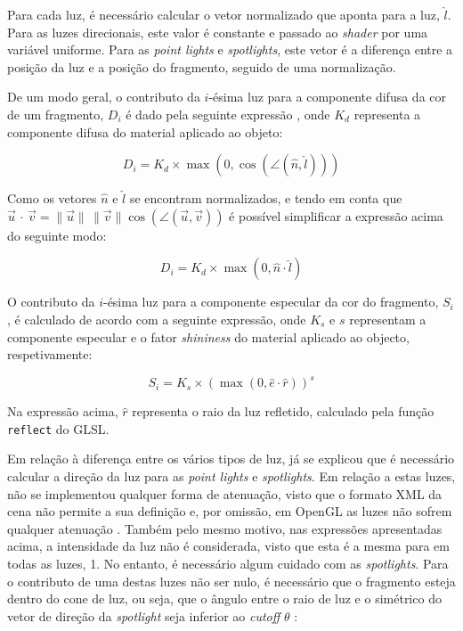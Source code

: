 \documentclass[12pt, a4paper]{article}
\begin{document}
Para cada luz, é necessário calcular o vetor normalizado que aponta para a luz, $\hat{l}$. Para as
luzes direcionais, este valor é constante e passado ao \emph{shader} por uma variável uniforme. Para
as \emph{point lights} e \emph{spotlights}, este vetor é a diferença entre a posição da luz e a
posição do fragmento, seguido de uma normalização.

De um modo geral, o contributo da $i$-ésima luz para a componente difusa da cor de um fragmento,
$D_i$ é dado pela seguinte expressão \cite{learn-opengl-1}, onde $K_d$ representa a componente
difusa do material aplicado ao objeto:

$$
D_i = K_d \times \max \left ( 0, \cos \left ( \angle (\hat{n}, \hat{l}) \right ) \right )
$$

Como os vetores $\hat{n}$ e $\hat{l}$ se encontram normalizados, e tendo em conta que
$
\vec{u} \, \cdot \, \vec{v} =
\lVert \vec{u} \rVert \, \lVert \vec{v} \rVert \cos (\angle (\vec{u}, \vec{v}))
$
é possível simplificar a expressão acima do seguinte modo:

$$
D_i = K_d \times \max \left ( 0, \hat{n} \cdot \hat{l} \right )
$$

O contributo da $i$-ésima luz para a componente especular da cor do fragmento, $S_i$, é calculado
de acordo com a seguinte expressão, onde $K_s$ e $s$ representam a componente especular e o fator
\emph{shininess} do material aplicado ao objecto, respetivamente:

$$
S_i = K_s \times \left ( \max \left (0, \hat{e} \cdot \hat{r} \right ) \right ) ^ s
$$

Na expressão acima, $\hat{r}$ representa o raio da luz refletido, calculado pela função
\texttt{reflect} do GLSL.

Em relação à diferença entre os vários tipos de luz, já se explicou que é necessário calcular a
direção da luz para as \emph{point lights} e \emph{spotlights}. Em relação a estas luzes, não se
implementou qualquer forma de atenuação, visto que o formato XML da cena não permite a sua definição
e, por omissão, em OpenGL as luzes não sofrem qualquer atenuação \cite{glLight}. Também pelo mesmo
motivo, nas expressões apresentadas acima, a intensidade da luz não é considerada, visto que esta é
a mesma para em todas as luzes, 1. No entanto, é necessário algum cuidado com as \emph{spotlights}.
Para o contributo de uma destas luzes não ser nulo, é necessário que o fragmento esteja dentro do
cone de luz, ou seja, que o ângulo entre o raio de luz e o simétrico do vetor de direção da
\emph{spotlight} seja inferior ao \emph{cutoff} $\theta$ \cite{learn-opengl-2}:
\end{document}
